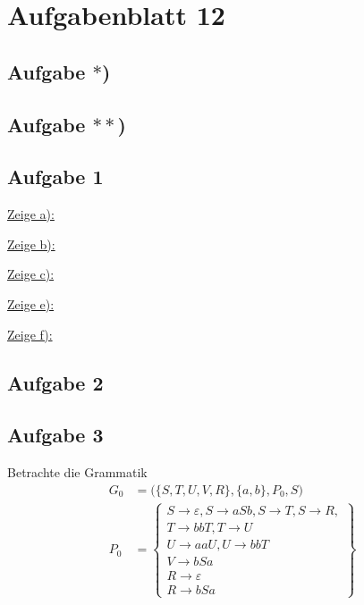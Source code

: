 
\section{Aufgabenblatt 12}
\subsection*{Aufgabe $\ast$)}

\subsection*{Aufgabe $\ast\ast$)}

\subsection{Aufgabe 1}

\begin{lösung}
	\underline{Zeige a):}
	
	\underline{Zeige b):}
	
	
	\underline{Zeige c):}
	
	
	\underline{Zeige e):}
		
	\underline{Zeige f):}
	
\end{lösung}

\subsection{Aufgabe 2}

\begin{lösung}
	
\end{lösung} 

\subsection{Aufgabe 3}
Betrachte die Grammatik
\begin{align*}
	G_0&=\Big(\lbrace S,T,U,V,R\rbrace,\lbrace a,b\rbrace,P_0,S\Big)\\
	P_0&=\left\lbrace
		\begin{array}{c}
			 S\to\varepsilon,S\to aSb,S\to T,S\to R,\\
			 T\to bbT, T\to U\\
			 U\to aa U,U\to bbT\\
			 V\to bSa\\
			 R\to\varepsilon\\
			 R\to bSa
		\end{array}\right\rbrace		
\end{align*}
	
